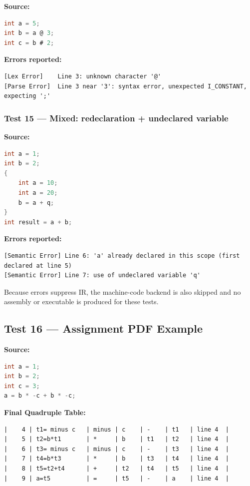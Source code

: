 \documentclass[11pt]{article}
\begin{document}
\textbf{Source:}
\begin{lstlisting}[style=cstyle, language=C]
int a = 5;
int b = a @ 3;
int c = b # 2;
\end{lstlisting}

\textbf{Errors reported:}
\begin{lstlisting}[style=outputstyle]
[Lex Error]    Line 3: unknown character '@'
[Parse Error]  Line 3 near '3': syntax error, unexpected I_CONSTANT, expecting ';'
\end{lstlisting}

\subsubsection{Test 15 --- Mixed: redeclaration + undeclared variable}

\textbf{Source:}
\begin{lstlisting}[style=cstyle, language=C]
int a = 1;
int b = 2;
{
    int a = 10;
    int a = 20;
    b = a + q;
}
int result = a + b;
\end{lstlisting}

\textbf{Errors reported:}
\begin{lstlisting}[style=outputstyle]
[Semantic Error] Line 6: 'a' already declared in this scope (first declared at line 5)
[Semantic Error] Line 7: use of undeclared variable 'q'
\end{lstlisting}

Because errors suppress IR, the machine-code backend is also skipped and no assembly or executable is produced for these tests.

\subsection{Test 16 --- Assignment PDF Example}

\textbf{Source:}
\begin{lstlisting}[style=cstyle, language=C]
int a = 1;
int b = 2;
int c = 3;
a = b * -c + b * -c;
\end{lstlisting}

\textbf{Final Quadruple Table:}
\begin{lstlisting}[style=outputstyle]
|    4 | t1= minus c   | minus | c    | -    | t1   | line 4  |
|    5 | t2=b*t1       | *     | b    | t1   | t2   | line 4  |
|    6 | t3= minus c   | minus | c    | -    | t3   | line 4  |
|    7 | t4=b*t3       | *     | b    | t3   | t4   | line 4  |
|    8 | t5=t2+t4      | +     | t2   | t4   | t5   | line 4  |
|    9 | a=t5          | =     | t5   | -    | a    | line 4  |
\end{lstlisting}
\end{document}
